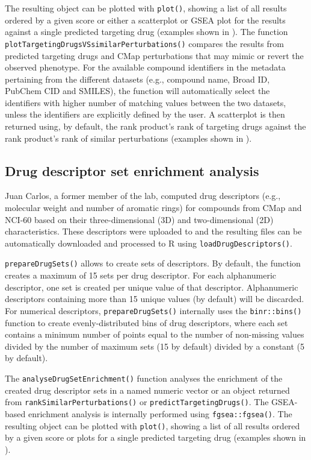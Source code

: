 The resulting object can be plotted with \texttt{plot()}, showing a list of all results ordered by a given score or either a scatterplot or GSEA plot for the results against a single predicted targeting drug (examples shown in ). The function \texttt{plotTargetingDrugsVSsimilarPerturbations()} compares the results from predicted targeting drugs and CMap perturbations that may mimic or revert the observed phenotype. For the available compound identifiers in the metadata pertaining from the different datasets (e.g., compound name, Broad ID, PubChem CID and SMILES), the function will automatically select the identifiers with higher number of matching values between the two datasets, unless the identifiers are explicitly defined by the user. A scatterplot is then returned using, by default, the rank product’s rank of targeting drugs against the rank product’s rank of similar perturbations (examples shown in ).

\subsection{Drug descriptor set enrichment analysis}

Juan Carlos, a former member of the lab, computed drug descriptors (e.g., molecu\-lar weight and number of aromatic rings) for compounds from CMap and NCI-60 based on their three-dimensional (3D) and two-dimensional (2D) characteristics. These descriptors were uploaded to  and the resulting files can be automatically downloaded and processed to R using \texttt{loadDrugDescriptors()}.

\texttt{prepareDrugSets()} allows to create sets of descriptors. By default, the function creates a maximum of 15 sets per drug descriptor. For each alphanumeric descriptor, one set is created per unique value of that descriptor. Alphanumeric descriptors containing more than 15 unique values (by default) will be discarded. For numerical descriptors, \texttt{prepareDrugSets()} internally uses the \texttt{binr::bins()} function to create evenly-distributed bins of drug descriptors, where each set contains a minimum number of points equal to the number of non-missing values divided by the number of maximum sets (15 by default) divided by a constant (5 by default).

The \texttt{analyseDrugSetEnrichment()} function analyses the enrichment of the created drug descriptor sets in a named numeric vector or an object returned from \texttt{rankSimilarPerturbations()} or \texttt{predictTargetingDrugs()}. The GSEA-based enrichment analysis is internally performed using \texttt{fgsea::fgsea()}. The resulting object can be plotted with \texttt{plot()}, showing a list of all results ordered by a given score or plots for a single predicted targeting drug (examples shown in ).


